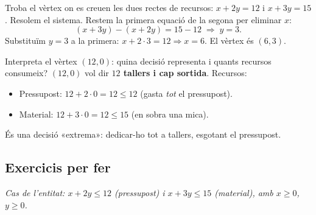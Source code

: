 \begin{exresolt}
Troba el vèrtex on es creuen les dues rectes de recursos: $x+2y=12$ i $x+3y=15$.
\solucio
Resolem el sistema. Restem la primera equació de la segona per eliminar $x$:
\[
(x+3y)-(x+2y)=15-12 \;\Rightarrow\; y=3.
\]
Substituïm $y=3$ a la primera: $x+2\cdot 3=12 \Rightarrow x=6$. El vèrtex és
$(6,3)$.
\end{exresolt}

\begin{exresolt}
Interpreta el vèrtex $(12,0)$: quina decisió representa i quants recursos consumeix?
\solucio
$(12,0)$ vol dir \textbf{$12$ tallers i cap sortida}. Recursos:
\begin{itemize}[leftmargin=1.4em, itemsep=1pt]
  \item Pressupost: $12+2\cdot 0=12\le 12$ (gasta \emph{tot} el pressupost).
  \item Material: $12+3\cdot 0=12\le 15$ (en sobra una mica).
\end{itemize}
És una decisió «extrema»: dedicar-ho tot a tallers, esgotant el pressupost.
\end{exresolt}

\subsection{Exercicis per fer}

\noindent\textit{Cas de l'entitat: $x+2y\le 12$ (pressupost) i $x+3y\le 15$
(material), amb $x\ge 0$, $y\ge 0$.}

